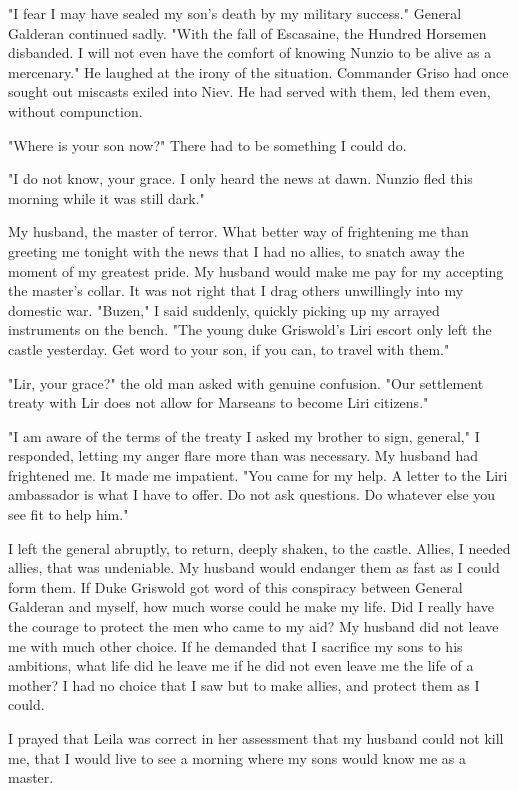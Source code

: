\documentclass{article}
\begin{document}
"I fear I may have sealed my son's death by my military success." General Galderan continued sadly. "With the fall of Escasaine, the Hundred Horsemen disbanded. I will not even have the comfort of knowing Nunzio to be alive as a mercenary." He laughed at the irony of the situation. Commander Griso had once sought out miscasts exiled into Niev. He had served with them, led them even, without compunction. 

"Where is your son now?" There had to be something I could do.

"I do not know, your grace. I only heard the news at dawn. Nunzio fled this morning while it was still dark." 

My husband, the master of terror. What better way of frightening me than greeting me tonight with the news that I had no allies, to snatch away the moment of my greatest pride. My husband would make me pay for my accepting the master's collar. It was not right that I drag others unwillingly into my domestic war.  "Buzen," I said suddenly, quickly picking up my arrayed instruments on the bench. "The young duke Griswold's Liri escort only left the castle yesterday. Get word to your son, if you can, to travel with them." 

"Lir, your grace?" the old man asked with genuine confusion. "Our settlement treaty with Lir does not allow for Marseans to become Liri citizens." 

"I am aware of the terms of the treaty I asked my brother to sign, general," I responded, letting my anger flare more than was necessary. My husband had frightened me. It made me impatient. "You came for my help. A letter to the Liri ambassador is what I have to offer. Do not ask questions. Do whatever else you see fit to help him."

I left the general abruptly, to return, deeply shaken, to the castle. Allies, I needed allies, that was undeniable. My husband would endanger them as fast as I could form them. If Duke Griswold got word of this conspiracy between General Galderan and myself, how much worse could he make my life. Did I really have the courage to protect the men who came to my aid? My husband did not leave me with much other choice. If he demanded that I sacrifice my sons to his ambitions, what life did he leave me if he did not even leave me the life of a mother? I had no choice that I saw but to make allies, and protect them as I could.

I prayed that Leila was correct in her assessment that my husband could not kill me, that I would live to see a morning where my sons would know me as a master.
\end{document}
